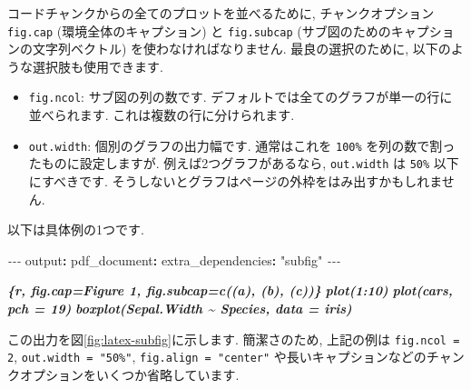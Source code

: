 \documentclass[
  11pt,
]{bxjsreport}
\newenvironment{Shaded}{\begin{snugshade}}{\end{snugshade}}
\newcommand{\AttributeTok}[1]{\textcolor[rgb]{0.77,0.63,0.00}{#1}}
\newcommand{\FunctionTok}[1]{\textcolor[rgb]{0.00,0.00,0.00}{#1}}
\newcommand{\InformationTok}[1]{\textcolor[rgb]{0.56,0.35,0.01}{\textbf{\textit{#1}}}}
\newcommand{\KeywordTok}[1]{\textcolor[rgb]{0.13,0.29,0.53}{\textbf{#1}}}
\newcommand{\PreprocessorTok}[1]{\textcolor[rgb]{0.56,0.35,0.01}{\textit{#1}}}
\newcommand{\StringTok}[1]{\textcolor[rgb]{0.31,0.60,0.02}{#1}}
\begin{document}
コードチャンクからの全てのプロットを並べるために, チャンクオプション \texttt{fig.cap} (環境全体のキャプション) と \texttt{fig.subcap} (サブ図のためのキャプションの文字列ベクトル) を使わなければなりません. 最良の選択のために, 以下のような選択肢も使用できます.

\begin{itemize}
\item
  \texttt{fig.ncol}: サブ図の列の数です. デフォルトでは全てのグラフが単一の行に並べられます. これは複数の行に分けられます.
\item
  \texttt{out.width}: 個別のグラフの出力幅です. 通常はこれを \texttt{100\%} を列の数で割ったものに設定しますが. 例えば2つグラフがあるなら, \texttt{out.width} は \texttt{50\%} 以下にすべきです. そうしないとグラフはページの外枠をはみ出すかもしれません.
\end{itemize}

以下は具体例の1つです.

\begin{Shaded}
\begin{Highlighting}[]
\PreprocessorTok{{-}{-}{-}}
\FunctionTok{output}\KeywordTok{:}
\AttributeTok{  }\FunctionTok{pdf\_document}\KeywordTok{:}
\AttributeTok{    }\FunctionTok{extra\_dependencies}\KeywordTok{:}\AttributeTok{ }\StringTok{"subfig"}
\PreprocessorTok{{-}{-}{-}}
\end{Highlighting}
\end{Shaded}

\begin{Shaded}
\begin{Highlighting}[]
\InformationTok{\textasciigrave{}\textasciigrave{}\textasciigrave{}\{r, fig.cap=\textquotesingle{}Figure 1\textquotesingle{}, fig.subcap=c(\textquotesingle{}(a)\textquotesingle{}, \textquotesingle{}(b)\textquotesingle{}, \textquotesingle{}(c)\textquotesingle{})\}}
\InformationTok{plot(1:10)}
\InformationTok{plot(cars, pch = 19)}
\InformationTok{boxplot(Sepal.Width \textasciitilde{} Species, data = iris)}
\InformationTok{\textasciigrave{}\textasciigrave{}\textasciigrave{}}
\end{Highlighting}
\end{Shaded}

この出力を図\ref{fig:latex-subfig}に示します. 簡潔さのため, 上記の例は \texttt{fig.ncol = 2}, \texttt{out.width = "50\%"}, \texttt{fig.align = "center"} や長いキャプションなどのチャンクオプションをいくつか省略しています.
\end{document}
